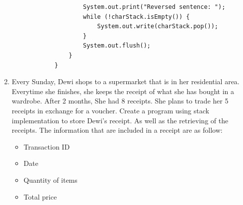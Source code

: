 \documentclass[12pt,titlepage]{article}
\begin{document}
\begin{enumerate}
{\begin{verbatim}
                    System.out.print("Reversed sentence: ");
                    while (!charStack.isEmpty()) {
                        System.out.write(charStack.pop());
                    }
                    System.out.flush();
                }
            }
        \end{verbatim}
    }
    \item {
        Every Sunday, Dewi shops to a supermarket that is in her residential area. Everytime she
        finishes, she keeps the receipt of what she has bought in a wardrobe. After 2 months, She had 8 receipts.
        She plans to trade her 5 receipts in exchange for a voucher. Create a program using stack implementation
        to store Dewi's receipt. As well as the retrieving of the receipts. The information that are included in a receipt are as follow:

        \begin{itemize}
            \item Transaction ID
            \item Date
            \item Quantity of items
            \item Total price
        \end{itemize}

        
    }
\end{enumerate}
\end{document}
